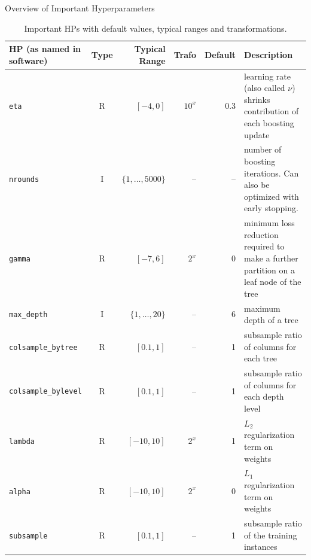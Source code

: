 \begin{vbframe}{Overview of Important Hyperparameters}
  \begin{tiny}

    \begin{table}[h!]
      \begin{tabular}{p{3cm}crrrp{3cm}} \toprule
        HP (as named in software)   & Type & Typical Range       & Trafo  & Default & Description                                                                            \\
        \midrule
        \texttt{eta}                & R    & $[-4, 0]$           & $10^x$ & 0.3     & learning rate (also called $\nu$) shrinks contribution of each boosting update         \\
        \texttt{nrounds}            & I    & $\{1,\ldots,5000\}$ & --     & --      & number of boosting iterations. Can also be optimized with early stopping.              \\
        \texttt{gamma}              & R    & $[-7,6]$            & $2^x$  & 0       & minimum loss reduction required to make a further partition on a leaf node of the tree \\
        \texttt{max\_depth}         & I    & $\{1,\ldots,20\}$   & --     & 6       & maximum depth of a tree                                                                \\
        \texttt{colsample\_bytree}  & R    & $[0.1,1]$           & --     & 1       & subsample ratio of columns for each tree                                               \\
        \texttt{colsample\_bylevel} & R    & $[0.1,1]$           & --     & 1       & subsample ratio of columns for each depth level                                        \\
        \texttt{lambda}             & R    & $[-10,10]$          & $2^x$  & 1       & $L_2$ regularization term on weights                                                   \\

        \texttt{alpha}              & R    & $[-10,10]$          & $2^x$  & 0       & $L_1$ regularization term on weights                                                   \\
        \texttt{subsample}          & R    & $[0.1,1]$           & --     & 1       & subsample ratio of the training instances                                              \\
        \bottomrule
      \end{tabular}
      \caption{Important  HPs with default values, typical ranges and transformations.}
    \end{table}
  \end{tiny}
\end{vbframe}

